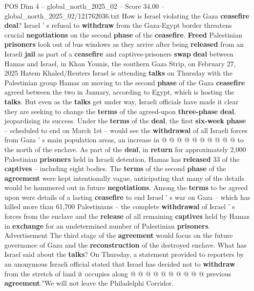 \begin{textsample}{POS Dim 4 – global\_north\_2025\_02 – Score 34.00 – global\_north\_2025\_02/121762036.txt}  \label{ex:f4_pos_053}
How is Israel violating the Gaza \textbf{ceasefire} \textbf{deal}?
Israel ' s refusal to \textbf{withdraw} from the Gaza-Egypt border threatens crucial \textbf{negotiations} on the second \textbf{phase} of the \textbf{ceasefire}. \textbf{Freed} Palestinian \textbf{prisoners} look out of bus windows as they arrive after being \textbf{released} from an Israeli \textbf{jail} as part of a \textbf{ceasefire} and captives-prisoners \textbf{swap} \textbf{deal} between Hamas and Israel, in Khan Younis, the southern Gaza Strip, on February 27, 2025 Hatem Khaled/Reuters Israel is attending \textbf{talks} on Thursday with the Palestinian group Hamas on moving to the second \textbf{phase} of the Gaza \textbf{ceasefire} agreed between the two in January, according to Egypt, which is hosting the \textbf{talks}.
But even as the \textbf{talks} get under way, Israeli officials have made it clear they are seeking to change the \textbf{terms} of the agreed-upon \textbf{three-phase} \textbf{deal}, jeopardising its success.
Under the \textbf{terms} of the \textbf{deal}, the first \textbf{six-week} \textbf{phase} -- scheduled to end on March 1st -- would see the \textbf{withdrawal} of all Israeli forces from Gaza ' s main population areas, an increase in @ @ @ @ @ @ @ @ @ @ to the north of the enclave.
As part of the \textbf{deal}, in \textbf{return} for approximately 2,000 Palestinian \textbf{prisoners} held in Israeli detention, Hamas has \textbf{released} 33 of the \textbf{captives} -- including eight bodies.
The \textbf{terms} of the second \textbf{phase} of the \textbf{agreement} were kept intentionally vague, anticipating that many of the details would be hammered out in future \textbf{negotiations}.
Among the \textbf{terms} to be agreed upon were details of a lasting \textbf{ceasefire} to end Israel ' s war on Gaza -- which has killed more than 61,700 Palestinians -- the complete \textbf{withdrawal} of Israel ' s forces from the enclave and the \textbf{release} of all remaining \textbf{captives} held by Hamas in \textbf{exchange} for an undetermined number of Palestinian \textbf{prisoners}.
Advertisement The third stage of the \textbf{agreement} would focus on the future governance of Gaza and the \textbf{reconstruction} of the destroyed enclave.
What has Israel said about the \textbf{talks}?
On Thursday, a statement provided to reporters by an anonymous Israeli official stated that Israel has decided not to \textbf{withdraw} from the stretch of land it occupies along @ @ @ @ @ @ @ @ @ @ previous \textbf{agreement}."We will not leave the Philadelphi Corridor.

\end{textsample}
